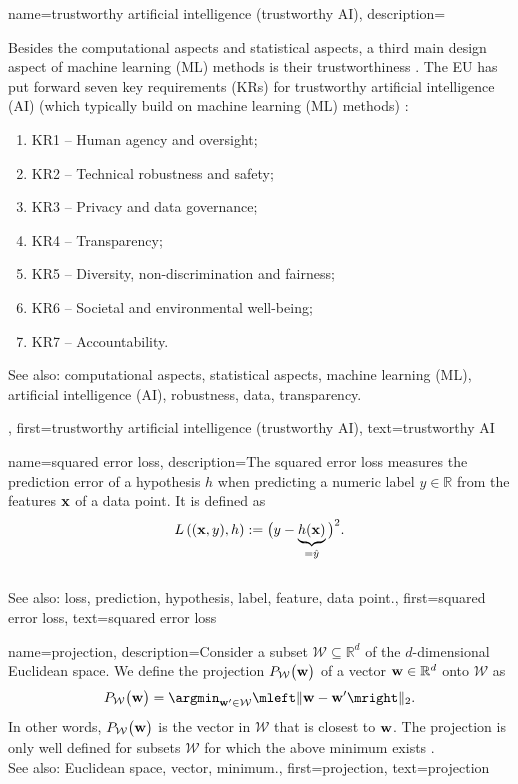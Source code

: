 {
{name={trustworthy artificial intelligence (trustworthy AI)},
	description={Besides the computational aspects and statistical aspects, a third main design aspect of 
		machine learning (ML) methods is their trustworthiness \cite{pfau2024engineeringtrustworthyaideveloper}. 
		The EU has put forward seven key requirements (KRs) for trustworthy 
		artificial intelligence (AI) (which typically build on machine learning (ML) methods) \cite{ALTAIEU}: 
	\begin{enumerate}[label=\arabic*)]
		\item KR1 – Human agency and oversight;
		\item KR2 – Technical robustness and safety;
		\item KR3 – Privacy and data governance;
		\item KR4 – Transparency;
		\item KR5 – Diversity, non-discrimination and fairness; 
		\item KR6 – Societal and environmental well-being;
		\item KR7 – Accountability. 
	\end{enumerate}
		See also: computational aspects, statistical aspects, machine learning (ML), artificial intelligence (AI), robustness, data, transparency.},
	first={trustworthy artificial intelligence (trustworthy AI)},
	text={trustworthy AI}
}

{name={squared error loss},
	description={The squared 
		error loss measures the prediction error of a 
		hypothesis $h$ when predicting a numeric label $y \in \mathbb{R}$ 
		from the features ${\bf x}$ of a data point. It is defined as 
		\begin{equation} 
			\nonumber
			L\left(({\bf x},y),h \right) := \big(y - \underbrace{h({\bf x})}_{=\hat{y}} \big)^{2}. 
		\end{equation} 
			\\ 
		See also: loss, prediction, hypothesis, label, feature, data point.},
	first={squared error loss},
	text={squared error loss}
}


 {name={projection}, 
       description={Consider a subset $\mathcal{W} \subseteq \mathbb{R}^{d}$ of 
	   the $d$-dimensional Euclidean space. We define the projection $P_{\mathcal{W}}\big( {\bf w}\big) $
	   of a vector ${\bf w} \in \mathbb{R}^{d}$ onto $\mathcal{W}$ as
	   \begin{equation} 
   	   	\nonumber
		\label{equ_def_proj_generic_dict}
  	    	P_{\mathcal{W}}\big( {\bf w}\big)  = \argmin_{{\bf w}' \in \mathcal{W}} \mleft\lVert {\bf w} - {\bf w}' \mright\rVert_{2}. 
        	    \end{equation}
	    In other words, $P_{\mathcal{W}}\big( {\bf w}\big) $ is the vector in $\mathcal{W}$ 
	    that is closest to ${\bf w}$. The projection is only well defined for subsets $\mathcal{W}$ 
	    for which the above minimum exists \cite{BoydConvexBook}.
		 			\\ 
	    See also: Euclidean space, vector, minimum.},
	first={projection},
	text={projection}
}


}
